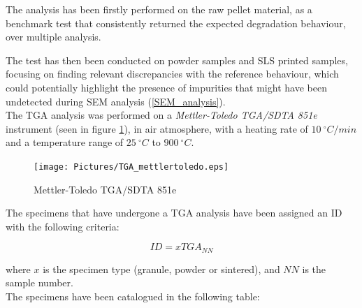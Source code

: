 \documentclass{article}
\begin{document}
        The analysis has been firstly performed on the raw pellet material, as a benchmark test
        that consistently returned the expected degradation behaviour, over multiple analysis. 

            The test has then been conducted on powder samples and SLS printed samples, focusing on finding relevant 
            discrepancies with the reference behaviour, which could potentially highlight the presence of impurities
            that might have been undetected during SEM analysis (\ref{SEM_analysis}). \\ 

            The TGA analysis was performed on a \textit{Mettler-Toledo TGA/SDTA 851e} \autocites{Mettler_Toledo} instrument (seen in figure \ref{fig:TGA_mettlertoledo}), 
            in air atmosphere, with a heating rate of $10 \ ^{\circ}C/min$ and a temperature range of $25 \ ^{\circ}C$ to $900 \ ^{\circ}C$. \\

            \begin{figure}[h!]
                \centering
                \texttt{[image: Pictures/TGA\_mettlertoledo.eps]}
                \caption{Mettler-Toledo TGA/SDTA 851e \autocites{Mettler_Toledo}}
                \label{fig:TGA_mettlertoledo}
            \end{figure}

            The specimens that have undergone a TGA analysis have been assigned an ID with the following criteria:

                \begin{equation}
                    ID = xTGA_{NN}
                    \label{eq:TGA_ID}
                \end{equation}

            where $x$ is the specimen type (granule, powder or sintered), and $NN$ is the sample number. \\

            The specimens have been catalogued in the following table:

                    \begin{table}[h!]
                        \centering
                        \caption{TGA specimens}
                        \label{tab:TGA_specimens}
                    \end{table}
\end{document}
